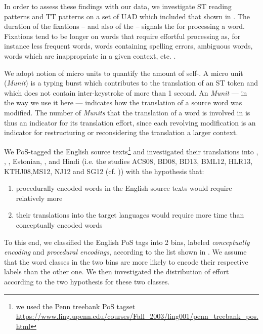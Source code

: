 \documentclass[output=paper]{LSP/langsci}
\begin{document}
In order to assess these findings with our data, we investigate ST reading patterns and TT  patterns on a set of UAD which included that shown in . The duration of the fixations -- and also of the  -- signals the  for processing a word. Fixations tend to be longer on words that require effortful processing as, for instance less frequent words, words containing spelling errors, ambiguous words, words which are inappropriate in a given context, etc. \citet[e.g.][413]{McConkie2003}.

We adopt \citet{Alves2011On} notion of micro units to quantify the amount of self-. A micro unit (\textit{Munit}) is a typing burst which contributes to the translation of an ST token and which does not contain inter-keystroke  of more than 1 second. An \textit{Munit} --- in the way we use it here --- indicates how the translation of a source word was modified. The number of \textit{Munits}  that the translation of a word is involved in is thus an indicator for its translation effort, since each revolving modification is an indicator for restructuring or reconsidering the translation a larger context.

We PoS-tagged the English source texts\footnote{we used the Penn treebank PoS tagset \url{https://www.ling.upenn.edu/courses/Fall\_2003/ling001/penn\_treebank\_pos.html}} and investigated their translations into , , , Estonian, , and Hindi (i.e. the studies ACS08, BD08, BD13, BML12, HLR13, KTHJ08,MS12, NJ12 and SG12 (cf. \citealt{Carl2016CRITT})) with the hypothesis that:

\begin{enumerate}
\item procedurally encoded words in the English source texts would require relatively more 
\item their translations into the target languages would require more  time than conceptually encoded words
\end{enumerate}



To this end, we classified the English PoS tags into 2 bins, labeled \textit{conceptually encoding} and \textit{procedural encodings}, according to the list shown in . We assume that the word classes in the two bins are more likely to encode their respective labels than the other one. We then investigated the distribution of effort according to the two hypothesis for these two classes.
\end{document}
